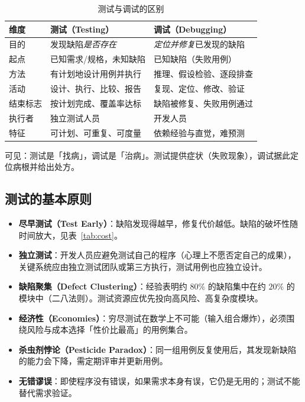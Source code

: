\begin{table}[H]
\centering
\caption{测试与调试的区别}
\label{tab:test-debug}
\begin{tabulary}{\textwidth}{LLL}
\toprule
维度 & 测试（Testing） & 调试（Debugging） \\
\midrule
目的 & 发现缺陷\emph{是否存在} & \emph{定位并修复}已发现的缺陷 \\
起点 & 已知需求/规格，未知缺陷 & 已知缺陷（失败用例） \\
方法 & 有计划地设计用例并执行 & 推理、假设检验、逐段排查 \\
活动 & 设计、执行、比较、报告 & 复现、定位、修改、验证 \\
结束标志 & 按计划完成、覆盖率达标 & 缺陷被修复、失败用例通过 \\
执行者 & 独立测试人员 & 开发人员 \\
特征 & 可计划、可重复、可度量 & 依赖经验与直觉，难预测 \\
\bottomrule
\end{tabulary}
\end{table}

可见：测试是「找病」，调试是「治病」。测试提供症状（失败现象），调试据此定位病根并给出处方。

\subsection{测试的基本原则}

\begin{itemize}
    \item \textbf{尽早测试（Test Early）}：缺陷发现得越早，修复代价越低。缺陷的破坏性随时间放大，见表~\ref{tab:cost}。
    \item \textbf{独立测试}：开发人员应避免测试自己的程序（心理上不愿否定自己的成果），关键系统应由独立测试团队或第三方执行，测试用例也应独立设计。
    \item \textbf{缺陷聚集（Defect Clustering）}：经验表明约 $80\%$ 的缺陷集中在约 $20\%$ 的模块中（二八法则）。测试资源应优先投向高风险、高复杂度模块。
    \item \textbf{经济性（Economies）}：穷尽测试在数学上不可能（输入组合爆炸），必须围绕风险与成本选择「性价比最高」的用例集合。
    \item \textbf{杀虫剂悖论（Pesticide Paradox）}：同一组用例反复使用后，其发现新缺陷的能力会下降，需定期评审并更新用例。
    \item \textbf{无错谬误}：即使程序没有错误，如果需求本身有误，它仍是无用的；测试不能替代需求验证。
\end{itemize}

